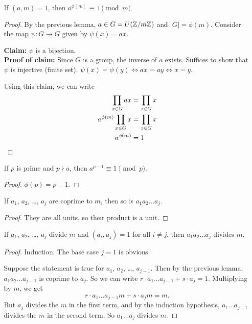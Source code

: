 \begin{theorem}[Euler] \label{thm:congruences:euler}
    If $(a, m) = 1$, then $a^{\phi(m)} \equiv 1 \pmod{m}$.
\end{theorem}
\begin{proof}
    By the previous lemma, $a \in G = U(\mathbb{Z}/m\mathbb{Z})$ and $|G| = \phi(m)$.
    Consider the map $\psi\colon G \to G$ given by $\psi(x) = ax$.

    \textbf{Claim:} $\psi$ is a bijection. \\
    \textbf{Proof of claim:}
    Since $G$ is a group, the inverse of $a$ exists.
    Suffices to show that $\psi$ is injective (finite set).
    $\psi(x) = \psi(y) \iff ax = ay \iff x = y$.

    Using this claim, we can write \begin{align*}
        \prod_{x \in G} ax &= \prod_{x \in G} x \\
        a^{\phi(m)} \prod_{x \in G} x &= \prod_{x \in G} x \\
        a^{\phi(m)} &= 1 \qedhere
    \end{align*}
\end{proof}
\begin{corollary} \label{thm:congruences:fermat}
    If $p$ is prime and $p \nmid a$, then $a^{p-1} \equiv 1 \pmod{p}$.
\end{corollary}
\begin{proof}
    $\phi(p) = p - 1$.
\end{proof}

\begin{lemma} \label{thm:cong:coprime_product}
    If $a_1$, $a_2$, \dots, $a_j$ are coprime to $m$, then so is
    $a_1 a_2 \dots a_j$.
\end{lemma}
\begin{proof}
    They are all units, so their product is a unit.
\end{proof}

\begin{lemma} \label{thm:cong:factor_product}
    If $a_1$, $a_2$, \dots, $a_j$ divide $m$ and $(a_i, a_j) = 1$ for all
    $i \ne j$, then $a_1 a_2 \dots a_j$ divides $m$.
\end{lemma}
\begin{proof}
    Induction.
    The base case $j = 1$ is obvious.

    Suppose the statement is true for $a_1$, $a_2$, \dots, $a_{j-1}$.
    Then by the previous lemma, $a_1 a_2 \dots a_{j-1}$ is coprime to $a_j$.
    So we can write $r \cdot a_1 \dots a_{j-1} + s \cdot a_j = 1$.
    Multiplying by $m$, we get \[
        r \cdot a_1 \dots a_{j-1} m + s \cdot a_j m = m.
    \] But $a_j$ divides the $m$ in the first term, and by the induction
    hypothesis, $a_1 \dots a_{j-1}$ divides the $m$ in the second term.
    So $a_1 \dots a_j$ divides $m$.
\end{proof}

